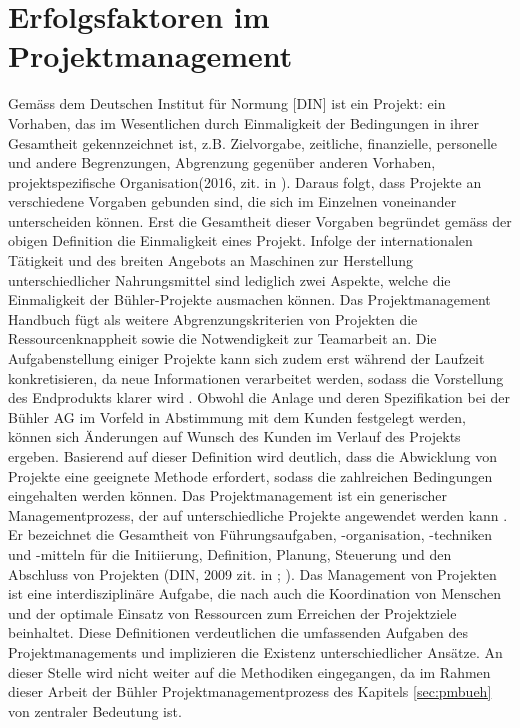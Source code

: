 \section{Erfolgsfaktoren im Projektmanagement} \label{sec:erfprj}	
Gemäss dem Deutschen Institut für Normung [DIN]  ist ein Projekt: \glqq ein Vorhaben, das im Wesentlichen durch Einmaligkeit der Bedingungen in ihrer Gesamtheit gekennzeichnet ist, z.B. Zielvorgabe, zeitliche, finanzielle, personelle und andere Begrenzungen, Abgrenzung gegenüber anderen Vorhaben, projektspezifische Organisation\grqq{ }(2016, zit. in \citealp*{alamg16}). Daraus folgt, dass Projekte an verschiedene Vorgaben gebunden sind, die sich im Einzelnen voneinander unterscheiden können. Erst die Gesamtheit dieser Vorgaben begründet gemäss der obigen Definition die Einmaligkeit eines Projekt. Infolge der internationalen Tätigkeit und des breiten Angebots an Maschinen zur Herstellung unterschiedlicher Nahrungsmittel sind lediglich zwei Aspekte, welche die Einmaligkeit der Bühler-Projekte ausmachen können. Das Projektmanagement Handbuch \citeyear{pmhod} fügt als weitere Abgrenzungskriterien von Projekten die Ressourcenknappheit sowie die Notwendigkeit zur Teamarbeit an. Die Aufgabenstellung einiger Projekte kann sich zudem erst während der Laufzeit konkretisieren, da neue Informationen verarbeitet werden, sodass die Vorstellung des Endprodukts klarer wird \citep*[S.~1]{meyreh16}. Obwohl die Anlage und deren Spezifikation bei der Bühler AG im Vorfeld in Abstimmung mit dem Kunden festgelegt werden, können sich Änderungen auf Wunsch des Kunden im Verlauf des Projekts ergeben. Basierend auf dieser Definition wird deutlich, dass die Abwicklung von Projekte eine geeignete Methode erfordert, sodass die zahlreichen Bedingungen eingehalten werden können. Das Projektmanagement ist ein \glqq generischer Managementprozess\grqq{}, der auf unterschiedliche Projekte angewendet werden kann \citealp*{pmhod}. Er bezeichnet die \glqq Gesamtheit von Führungsaufgaben, -organisation, -techniken und -mitteln für die Initiierung, Definition, Planung, Steuerung und den Abschluss von Projekten\grqq{} (DIN, 2009 zit. in \citealp*[S.~3]{meyreh16}; \citet{pmhod}). Das Management von Projekten ist eine interdisziplinäre Aufgabe, die nach \citet[S.~2]{alamg16} auch \glqq die Koordination von Menschen und der optimale Einsatz von Ressourcen zum Erreichen der Projektziele\grqq{ } beinhaltet. Diese Definitionen verdeutlichen die umfassenden Aufgaben des Projektmanagements und implizieren die Existenz unterschiedlicher Ansätze. An dieser Stelle wird nicht weiter auf die Methodiken eingegangen, da im Rahmen dieser Arbeit der Bühler Projektmanagementprozess des Kapitels \ref{sec:pmbueh} von zentraler Bedeutung ist.
